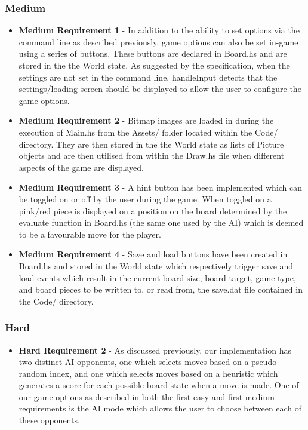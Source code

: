 \documentclass[11]{article}
\begin{document}
		\subsubsection{Medium}
			\begin{itemize}
				\item \textbf{Medium Requirement 1} - In addition to the ability to set options via the command line as described previously, game options can also be set in-game using a series of buttons. These buttons are declared in Board.hs and are stored in the the World state. As suggested by the specification, when the settings are not set in the command line, handleInput detects that the settings/loading screen should be displayed to allow the user to configure the game options. 
				\item \textbf{Medium Requirement 2} - Bitmap images are loaded in during the execution of Main.hs from the Assets/ folder located within the Code/ directory. They are then stored in the the World state as lists of Picture objects and are then utilised from within the Draw.hs file when different aspects of the game are displayed.
				\item \textbf{Medium Requirement 3} - A hint button has been implemented which can be toggled on or off by the user during the game. When toggled on a pink/red piece is displayed on a position on the board determined by the evaluate function in Board.hs (the same one used by the AI) which is deemed to be a favourable move for the player.
				\item \textbf{Medium Requirement 4} - Save and load buttons have been created in Board.hs and stored in the World state which respectively trigger save and load events which result in the current board size, board target, game type, and board pieces to be written to, or read from, the save.dat file contained in the Code/ directory.
			\end{itemize}
		\subsubsection{Hard}
				\begin{itemize}
					\item \textbf{Hard Requirement 2} - As discussed previously, our implementation has two distinct AI opponents, one which selects moves based on a pseudo random index, and one which selects moves based on a heuristic which generates a score for each possible board state when a move is made. One of our game options as described in both the first easy and first medium requirements is the AI mode which allows the user to choose between each of these opponents.
				\end{itemize}
\end{document}
